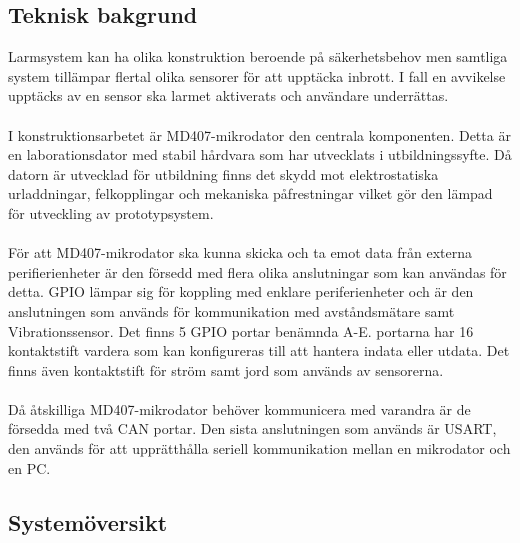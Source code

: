 \documentclass{article}
\begin{document}
\subsection{Teknisk bakgrund}
Larmsystem kan ha olika konstruktion beroende på säkerhetsbehov men samtliga system tillämpar flertal olika sensorer för att upptäcka inbrott. 
I fall en avvikelse upptäcks av en sensor ska larmet aktiverats och användare underrättas.
\\
\\
I konstruktionsarbetet är MD407-mikrodator den centrala komponenten. 
Detta är en laborationsdator med stabil hårdvara som har utvecklats i utbildningssyfte. 
Då datorn är utvecklad för utbildning finns det skydd mot elektrostatiska urladdningar, felkopplingar och mekaniska påfrestningar vilket gör den lämpad för utveckling av prototypsystem.
\\
\\
För att MD407-mikrodator ska kunna skicka och ta emot data från externa perifierienheter är den försedd med flera olika anslutningar som kan användas för detta. 
GPIO lämpar sig för koppling med enklare periferienheter och är den anslutningen som används för kommunikation med avståndsmätare samt Vibrationssensor. 
Det finns 5 GPIO portar benämnda A-E. portarna har 16 kontaktstift vardera som kan konfigureras till att hantera indata eller utdata. 
Det finns även kontaktstift för ström samt jord som används av sensorerna.
\\
\\
Då åtskilliga MD407-mikrodator behöver kommunicera med varandra är de försedda med två CAN portar. Den sista anslutningen som används är USART, den används för att upprätthålla seriell kommunikation mellan en mikrodator och en PC.

\newpage
\subsection{Systemöversikt}
\end{document}

